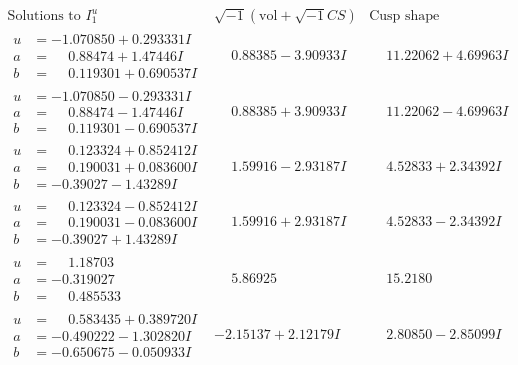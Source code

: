 \documentclass[1p]{elsarticle_modified}
\theoremstyle{definition}
\newcommand{\I}{\sqrt{-1}}
\begin{document}
$$\begin{array}{c|c|c}  
\text{Solutions to }I^u_{1}& \I (\text{vol} + \sqrt{-1}CS) & \text{Cusp shape}\\
 \hline 
\begin{aligned}
u &= -1.070850 + 0.293331 I \\
a &= \phantom{-}0.88474 + 1.47446 I \\
b &= \phantom{-}0.119301 + 0.690537 I\end{aligned}
 & \phantom{-}0.88385 - 3.90933 I & \phantom{-}11.22062 + 4.69963 I \\ \hline\begin{aligned}
u &= -1.070850 - 0.293331 I \\
a &= \phantom{-}0.88474 - 1.47446 I \\
b &= \phantom{-}0.119301 - 0.690537 I\end{aligned}
 & \phantom{-}0.88385 + 3.90933 I & \phantom{-}11.22062 - 4.69963 I \\ \hline\begin{aligned}
u &= \phantom{-}0.123324 + 0.852412 I \\
a &= \phantom{-}0.190031 + 0.083600 I \\
b &= -0.39027 - 1.43289 I\end{aligned}
 & \phantom{-}1.59916 - 2.93187 I & \phantom{-}4.52833 + 2.34392 I \\ \hline\begin{aligned}
u &= \phantom{-}0.123324 - 0.852412 I \\
a &= \phantom{-}0.190031 - 0.083600 I \\
b &= -0.39027 + 1.43289 I\end{aligned}
 & \phantom{-}1.59916 + 2.93187 I & \phantom{-}4.52833 - 2.34392 I \\ \hline\begin{aligned}
u &= \phantom{-}1.18703\phantom{ +0.000000I} \\
a &= -0.319027\phantom{ +0.000000I} \\
b &= \phantom{-}0.485533\phantom{ +0.000000I}\end{aligned}
 & \phantom{-}5.86925\phantom{ +0.000000I} & \phantom{-}15.2180\phantom{ +0.000000I} \\ \hline\begin{aligned}
u &= \phantom{-}0.583435 + 0.389720 I \\
a &= -0.490222 - 1.302820 I \\
b &= -0.650675 - 0.050933 I\end{aligned}
 & -2.15137 + 2.12179 I & \phantom{-}2.80850 - 2.85099 I \\ \hline\begin{aligned}

\end{aligned}
\end{array}$$
\end{document}
